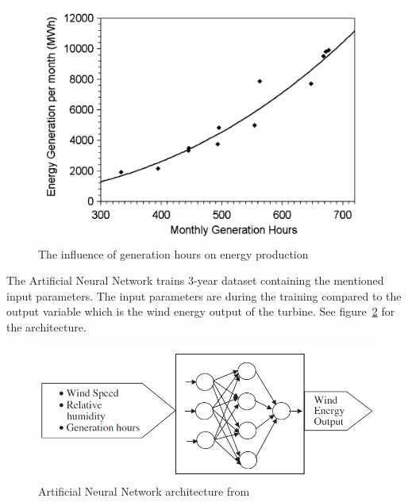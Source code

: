 \begin{figure}[h!]
\centering
\includegraphics[width=0.8\linewidth,natwidth=898,natheight=587]{billeder/GenerationHourVSGeneration.png}
\caption{The influence of generation hours on energy production \cite{WindPowerGenerationUsingANN}}
\label{fig:energyGenerationFromHours}
\end{figure} 

The Artificial Neural Network trains 3-year dataset containing the mentioned input parameters. The input parameters are during the training compared to the output variable which is the wind energy output of the turbine. See figure~\ref{fig:annArchitecture} for the architecture.
\\[0.5cm]
\begin{figure}[h!]
\centering
\includegraphics[width=0.7\linewidth,natwidth=898,natheight=587]{billeder/ANNwindSpeedPrediction.png}
\caption{Artificial Neural Network architecture from \cite{WindPowerGenerationUsingANN}}
\label{fig:annArchitecture}
\end{figure}